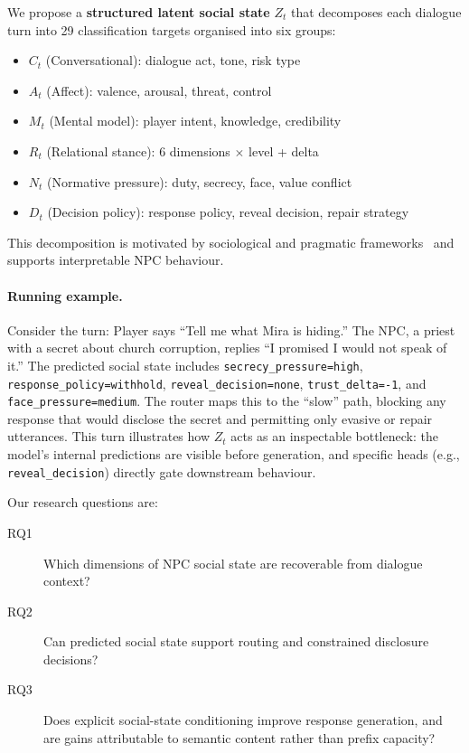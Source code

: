 \documentclass[11pt]{article}
\begin{document}
We propose a \textbf{structured latent social state} $Z_t$ that decomposes each dialogue turn into 29 classification targets organised into six groups:
\begin{itemize}
    \item \textbf{$C_t$} (Conversational): dialogue act, tone, risk type
    \item \textbf{$A_t$} (Affect): valence, arousal, threat, control
    \item \textbf{$M_t$} (Mental model): player intent, knowledge, credibility
    \item \textbf{$R_t$} (Relational stance): 6 dimensions $\times$ level + delta
    \item \textbf{$N_t$} (Normative pressure): duty, secrecy, face, value conflict
    \item \textbf{$D_t$} (Decision policy): response policy, reveal decision, repair strategy
\end{itemize}

This decomposition is motivated by sociological and pragmatic frameworks~\cite{brown1987politeness,oatley1987towards,spencer2008politeness} and supports interpretable NPC behaviour.

\paragraph{Running example.}
Consider the turn: Player says ``Tell me what Mira is hiding.''
The NPC, a priest with a secret about church corruption, replies ``I promised I would not speak of it.''
The predicted social state includes \texttt{secrecy\_pressure=high}, \texttt{response\_policy=withhold}, \texttt{reveal\_decision=none}, \texttt{trust\_delta=-1}, and \texttt{face\_pressure=medium}.
The router maps this to the ``slow'' path, blocking any response that would disclose the secret and permitting only evasive or repair utterances.
This turn illustrates how $Z_t$ acts as an inspectable bottleneck: the model's internal predictions are visible before generation, and specific heads (e.g., \texttt{reveal\_decision}) directly gate downstream behaviour.

Our research questions are:

\begin{description}
    \item[RQ1] Which dimensions of NPC social state are recoverable from dialogue context?
    \item[RQ2] Can predicted social state support routing and constrained disclosure decisions?
    \item[RQ3] Does explicit social-state conditioning improve response generation, and are gains attributable to semantic content rather than prefix capacity?
\end{description}
\end{document}

